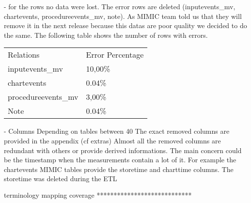 - for the rows no data were lost. 
The error rows are deleted (inputevents_mv, chartevents, procedureevents_mv, note). As MIMIC team told us that they will remove it in the next release because this datas are poor quality we decided to do the same. 
The following table shows the number of rows with errors.


\begin{table}[]
\begin{tabular}{ll}
Relations           & Error Percentage \\
inputevents\_mv     & 10,00\%          \\
chartevents         & 0.04\%           \\
procedureevents\_mv & 3,00\%           \\
Note                & 0.04\%          
\end{tabular}
\end{table}

- Columns
Depending on tables between 40 %
The exact removed columns are provided in the appendix (cf extras)
Almost all the removed columns are redundant with others or provide derived informations. 
The main concern could be the timestamp when the measurements contain a lot of it.
For example the chartevents MIMIC tables provide the storetime and charttime columns. 
The storetime was deleted during the ETL

terminology mapping coverage
****************************

